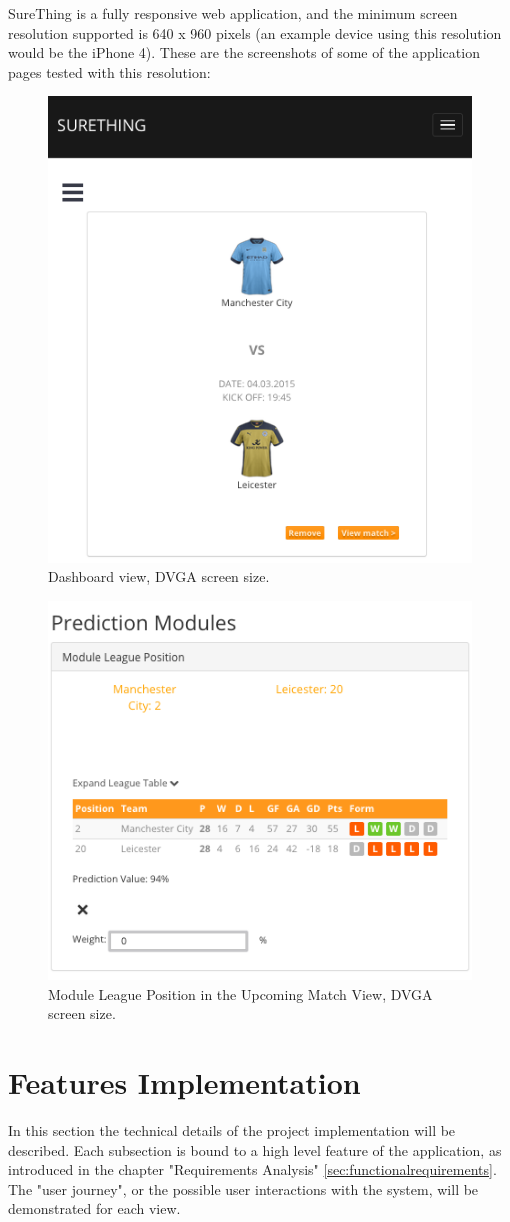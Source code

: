 SureThing is a fully responsive web application, and the minimum screen resolution supported is 640 x 960 pixels (an example device using this resolution would be the iPhone 4). These are the screenshots of some of the application pages tested with this resolution:

\begin{figure}[H]
	\begin{center}
		\includegraphics[width=.50\textwidth]{impl/images/responsiveDashboard}
		\caption{Dashboard view, DVGA screen size.} \label{fig:using:responsivedashboard}
	\end{center}
\end{figure}

\begin{figure}[H]
	\begin{center}
		\includegraphics[width=.50\textwidth]{impl/images/responsiveModuleLeaguePosition}
		\caption{Module League Position in the Upcoming Match View, DVGA screen size.} \label{fig:using:responsivemoduleleagueposition}
	\end{center}
\end{figure}

\section{Features Implementation}
In this section the technical details of the project implementation will be described. Each subsection is bound to a high level feature of the application, as introduced in the chapter "Requirements Analysis" \ref{sec:functionalrequirements}. The "user journey", or the possible user interactions with the system, will be demonstrated for each view.


